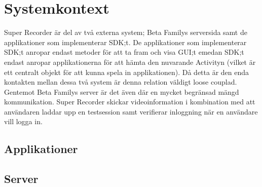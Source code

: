 \section{Systemkontext}

Super Recorder är del av två externa system; Beta Familys serversida samt de applikationer som implementerar SDK;t. De applikationer som implementerar SDK;t anropar endast metoder för att ta fram och visa GUI;t emedan SDK;t endast anropar applikationerna för att hämta den nuvarande Activityn (vilket är ett centralt objekt för att kunna spela in applikationen). Då detta är den enda kontakten mellan dessa två system är denna relation väldigt loose couplad. 
Gentemot Beta Familys server är det även där en mycket begränsad mängd kommunikation. Super Recorder skickar videoinformation i kombination med att användaren laddar upp en testsession samt verifierar inloggning när en användare vill logga in. 

\subsection{Applikationer}


\subsection{Server}

